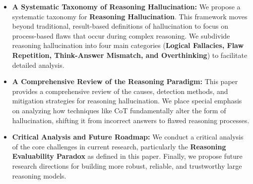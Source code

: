 \begin{itemize}[leftmargin=16pt, itemsep=0pt, topsep=0pt]
    \item \textbf{A Systematic Taxonomy of Reasoning Hallucination:}
    We propose a systematic taxonomy for \textbf{Reasoning Hallucination}.
    This framework moves beyond traditional, result-based definitions of hallucination to focus on process-based flaws that occur during complex reasoning.
    We subdivide reasoning hallucination into four main categories (\textbf{Logical Fallacies, Flaw Repetition, Think-Answer Mismatch, and Overthinking}) to facilitate detailed analysis.

    \item \textbf{A Comprehensive Review of the Reasoning Paradigm:}
    This paper provides a comprehensive review of the causes, detection methods, and mitigation strategies for reasoning hallucination.
    We place special emphasis on analyzing how techniques like CoT fundamentally alter the form of hallucination, shifting it from incorrect answers to flawed reasoning processes.

    \item \textbf{Critical Analysis and Future Roadmap:}
    We conduct a critical analysis of the core challenges in current research, particularly the \textbf{Reasoning Evaluability Paradox} as defined in this paper.
    Finally, we propose future research directions for building more robust, reliable, and trustworthy large reasoning models.
\end{itemize}
